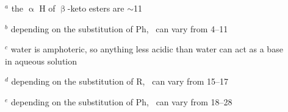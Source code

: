 \documentclass[10pt]{article}
\begin{document}
\bigskip

$^{\textit{a}}$ the $\upalpha$ H of $\upbeta$-keto esters are $\sim$11

$^{\textit{b}}$ depending on the substitution of Ph, \pKa\ can vary from 4--11

$^{\textit{c}}$ water is amphoteric, so anything less acidic than water can act as a base \\ \hspace*{1.4mm} in aqueous solution

$^{\textit{d}}$ depending on the substitution of R, \pKa\ can vary from 15--17

$^{\textit{e}}$ depending on the substitution of Ph, \pKa\ can vary from 18--28

\bigskip{}



{

}







{

}
\end{document}
